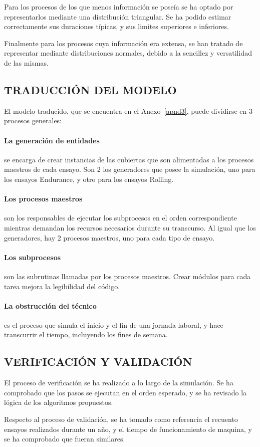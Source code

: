 Para los procesos de los que menos información se poseía
se ha optado por representarlos mediante una distribución triangular.
Se ha podido estimar correctamente sus duraciones típicas, y sus limites superiores e inferiores.

Finalmente para los procesos cuya información era extensa,
se han tratado de representar mediante distribuciones normales,
debido a la sencillez y versatilidad de las mismas.

\subsection{TRADUCCIÓN DEL MODELO}

El modelo traducido, que se encuentra en el Anexo~\ref{apnd3},
puede dividirse en 3 procesos generales:

\paragraph{La generación de entidades}
se encarga de crear instancias de las cubiertas que son alimentadas
a los procesos maestros de cada ensayo.
Son 2 los generadores que posee la simulación,
uno para los ensayos Endurance, y otro para los ensayos Rolling.

\paragraph{Los procesos maestros}
son los responsables de ejecutar los subprocesos
en el orden correspondiente mientras demandan
los recursos necesarios durante su transcurso.
Al igual que los generadores, hay 2 procesos maestros,
uno para cada tipo de ensayo.

\paragraph{Los subprocesos}
son las subrutinas llamadas por los procesos maestros.
Crear módulos para cada tarea mejora la legibilidad del código.

\paragraph{La obstrucción del técnico}
es el proceso que simula el inicio y el fin de una jornada laboral,
y hace transcurrir el tiempo, incluyendo los fines de semana.

\subsection{VERIFICACIÓN Y VALIDACIÓN}

El proceso de verificación se ha realizado a lo largo de la simulación.
Se ha comprobado que los pasos se ejecutan en el orden esperado,
y se ha revisado la lógica de los algoritmos propuestos.

Respecto al proceso de validación,
se ha tomado como referencia el recuento ensayos realizados durante un año,
y el tiempo de funcionamiento de maquina, y se ha comprobado que fueran similares. 
